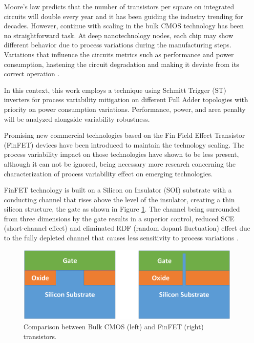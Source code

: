 \documentclass[ecp,tc, english]{iiufrgs}
\begin{document}
Moore’s law predicts that the number of transistors per square on integrated circuits will double every year and it has been guiding the industry trending for decades. However, continue with scaling in the bulk CMOS technology has been no straightforward task. At deep nanotechnology nodes, each chip may show different behavior due to process variations during the manufacturing steps. Variations that influence the circuits metrics such as performance and power consumption, hastening the circuit degradation and making it deviate from its correct operation \cite{abbas:15} \cite{nassif:08}. 

In this context, this work employs a technique using Schmitt Trigger (ST) inverters for process variability mitigation on different Full Adder topologies with priority on power consumption variations. Performance, power, and area penalty will be analyzed alongside variability robustness. 

Promising new commercial technologies based on the Fin Field Effect Transistor (FinFET) devices have been introduced to maintain the technology scaling. The process variability impact on those technologies have shown to be less present, although it can not be ignored, being necessary more research concerning the characterization of process variability effect on emerging technologies. 

FinFET technology is built on a Silicon on Insulator (SOI) substrate with a conducting channel that rises above the level of the insulator, creating a thin silicon structure, the gate as shown in Figure \ref{fig:Fig1}. The channel being surrounded from three dimensions by the gate results in a superior control, reduced SCE (short-channel effect) and eliminated RDF (random dopant fluctuation) effect due to the fully depleted channel that causes less sensitivity to process variations \cite{taur2013fundamentals}. 

\begin{figure}[ht]
\centering
\includegraphics[width=.8\textwidth, trim={0 3cm 0 5cm},clip]{bulkvsfinfet.eps}
\caption{Comparison between Bulk CMOS (left) and FinFET (right) transistors.}
\label{fig:Fig1}
\end{figure}
\end{document}
